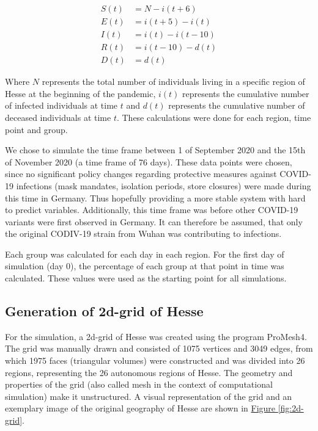 \begin{align}
	S(t) &= N - i(t+6)\\
	E(t) &= i(t+5) - i(t)\\
	I(t) &= i(t) - i(t-10)\\
	R(t) &= i(t-10) - d(t)\\
	D(t) &= d(t)
\end{align}

\par
Where $N$ represents the total number of individuals living in a specific region of Hesse at the beginning of the pandemic, $i(t)$
represents the cumulative number of infected individuals at time $t$ and $d(t)$ represents the cumulative number of deceased
individuals at time $t$. These calculations were done for each region, time point and group.\newline

We chose to simulate the time frame between 1 of September 2020 and the 15{th} of November 2020 (a time frame of 76 days). These
data points were chosen, since no significant policy changes regarding protective measures against COVID-19 infections
(mask mandates, isolation periods, store closures)  were made during this time in Germany. Thus hopefully providing a more stable system
with hard to predict variables. Additionally, this time frame was before other COVID-19 variants were first observed in
Germany\cite{RKIvariants}. It can therefore be assumed, that only the original CODIV-19 strain from Wuhan was contributing to infections.\newline

Each group was calculated for each day in each region. For the first day of simulation (day 0), the percentage of each group at that
point in time was calculated. These values were used as the starting point for all simulations.


\subsection{Generation of 2d-grid of Hesse}
For the simulation, a 2d-grid of Hesse was created using the program ProMesh4. The grid was manually drawn and consisted
of 1075 vertices and 3049 edges, from which 1975 faces (triangular volumes) were constructed and was divided into 26 regions,
representing the 26 autonomous regions of Hesse. The geometry and properties of the grid (also called mesh in the context of computational simulation)
make it unstructured. A visual representation of the grid and an exemplary
image of the original geography of Hesse are shown in \hyperref[fig:2d-grid]{Figure \ref*{fig:2d-grid}}.

